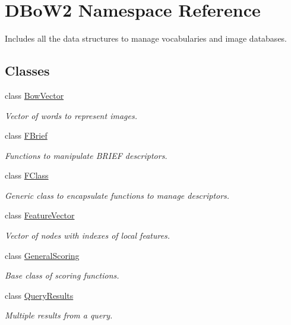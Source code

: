 \hypertarget{namespaceDBoW2}{}\section{D\+Bo\+W2 Namespace Reference}
\label{namespaceDBoW2}


Includes all the data structures to manage vocabularies and image databases.  


\subsection*{Classes}
\begin{DoxyCompactItemize}
\item 
class \hyperlink{classDBoW2_1_1BowVector}{Bow\+Vector}
\begin{DoxyCompactList}\small\item\em Vector of words to represent images. \end{DoxyCompactList}\item 
class \hyperlink{classDBoW2_1_1FBrief}{F\+Brief}
\begin{DoxyCompactList}\small\item\em Functions to manipulate B\+R\+I\+EF descriptors. \end{DoxyCompactList}\item 
class \hyperlink{classDBoW2_1_1FClass}{F\+Class}
\begin{DoxyCompactList}\small\item\em Generic class to encapsulate functions to manage descriptors. \end{DoxyCompactList}\item 
class \hyperlink{classDBoW2_1_1FeatureVector}{Feature\+Vector}
\begin{DoxyCompactList}\small\item\em Vector of nodes with indexes of local features. \end{DoxyCompactList}\item 
class \hyperlink{classDBoW2_1_1GeneralScoring}{General\+Scoring}
\begin{DoxyCompactList}\small\item\em Base class of scoring functions. \end{DoxyCompactList}\item 
class \hyperlink{classDBoW2_1_1QueryResults}{Query\+Results}
\begin{DoxyCompactList}\small\item\em Multiple results from a query. \end{DoxyCompactList}\item 

\end{DoxyCompactItemize}
